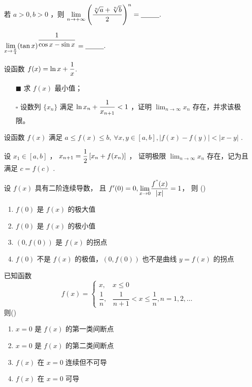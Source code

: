 \begin{Quest}[C1T15\goto{T4}]
    若 $ a>0,b>0 $ ，则 $ \displaystyle {\displaystyle\lim_{n\rightarrow +\infty}}
    \left(\frac{\sqrt[n]a+\sqrt[n]b}{2}\right)^n = \underline{~~~~~~~~}. $ 
\end{Quest}

\begin{Quest}[C1T16\goto{T5}]
    $ \displaystyle {\displaystyle\lim_{x\rightarrow \frac{\pi}{4}}}(\tan x)^{\displaystyle\frac{1}{\cos x-\sin x}} = \underline{~~~~~~~~}. $ 
\end{Quest}

\begin{Quest}[C1T20\goto{T6}]
    设函数 $\displaystyle f(x)=\ln x + \frac{1}{x} $.
    \begin{itemize}
        \item[$ \blacksquare $ ] 求 $ f(x) $ 最小值；
        \item[$ \square $ ] 设数列 $ \{x_n\} $ 满足 $ \displaystyle \ln x_n + \frac{1}{x_{n+1}}<1 $ ，证明
        $ {\displaystyle\lim_{n\rightarrow \infty}}x_n $ 存在，并求该极限。
    \end{itemize}
\end{Quest}

\begin{Quest}[C1T22\goto{T7}]
    设函数 $ f(x) $ 满足 $a \leq f(x)\leq b,\ \forall x,y\in [a,b],|f(x)-f(y)|<|x-y|  $ .

    设 $ x_1\in[a,b] $ ， $\displaystyle x_{n+1}=\frac{1}{2}\left[x_n+f(x_n)\right] $ ，
    证明极限 $ {\displaystyle\lim_{n\rightarrow \infty}}x_n $ 存在，记为且满足
    $ c=f(c) $ .
\end{Quest}

\begin{quest}[C2T1]
    设 $ f(x) $ 具有二阶连续导数，
    且 $ f'(0) = 0,{\displaystyle\lim_{x\rightarrow 0}}\dfrac{f^"(x)}{|x|} = 1 $，
    则 ()
    \begin{enumerate}
        \item $ f(0) $ 是 $ f(x) $ 的极大值
        \item $ f(0) $ 是 $ f(x) $ 的极小值
        \item $ (0,f(0)) $ 是 $ f(x) $ 的拐点
        \item $ f(0) $ 不是 $ f(x) $ 的极值，$ (0,f(0)) $ 也不是曲线 $ y=f(x) $ 的拐点
    \end{enumerate} 
\end{quest}


\begin{quest}[C2T8]
    已知函数$$
    f(x) = \begin{cases}
        x,&x\leq 0\\
        \dfrac{1}{n},&\dfrac{1}{n+1}<x\leq \dfrac{1}{n}, n = 1,2,\dots
    \end{cases}
$$ 则()
\begin{enumerate}
    \item $ x=0 $ 是 $ f(x) $ 的第一类间断点
    \item $ x=0 $ 是 $ f(x) $ 的第二类间断点
    \item $ f(x) $ 在 $ x=0 $ 连续但不可导
    \item $ f(x) $ 在 $ x=0 $ 可导
\end{enumerate}
\end{quest}

